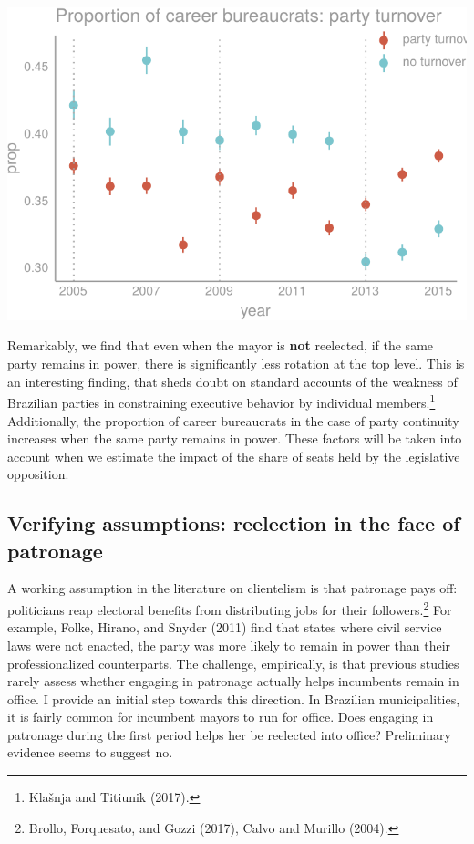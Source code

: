 \documentclass[12pt,]{article}
\let\rmarkdownfootnote\footnote%
\def\footnote{\protect\rmarkdownfootnote}
\begin{document}
\begin{center}\includegraphics{dissertation_files/figure-latex/party turnover-2} \end{center}

Remarkably, we find that even when the mayor is \textbf{not} reelected,
if the same party remains in power, there is significantly less rotation
at the top level. This is an interesting finding, that sheds doubt on
standard accounts of the weakness of Brazilian parties in constraining
executive behavior by individual members.\footnote{Klašnja and Titiunik
  (2017).} Additionally, the proportion of career bureaucrats in the
case of party continuity increases when the same party remains in power.
These factors will be taken into account when we estimate the impact of
the share of seats held by the legislative opposition.

\hypertarget{verifying-assumptions-reelection-in-the-face-of-patronage}{%
\subsection{Verifying assumptions: reelection in the face of
patronage}\label{verifying-assumptions-reelection-in-the-face-of-patronage}}

A working assumption in the literature on clientelism is that patronage
pays off: politicians reap electoral benefits from distributing jobs for
their followers.\footnote{Brollo, Forquesato, and Gozzi (2017), Calvo
  and Murillo (2004).} For example, Folke, Hirano, and Snyder (2011)
find that states where civil service laws were not enacted, the party
was more likely to remain in power than their professionalized
counterparts. The challenge, empirically, is that previous studies
rarely assess whether engaging in patronage actually helps incumbents
remain in office. I provide an initial step towards this direction. In
Brazilian municipalities, it is fairly common for incumbent mayors to
run for office. Does engaging in patronage during the first period helps
her be reelected into office? Preliminary evidence seems to suggest no.
\end{document}
